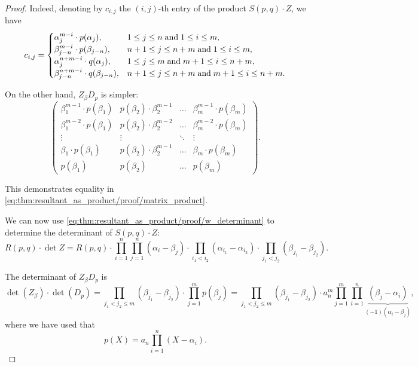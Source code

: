 \begin{proof}
  Indeed, denoting by \( c_{i,j} \) the \( (i, j) \)-th entry of the product \( S(p, q) \cdot Z \), we have
  \begin{equation*}
    c_{i,j} = \begin{cases}
      \alpha_j^{m-i} \cdot p(\alpha_j),         &1 \leq j \leq n \T{and} 1 \leq i \leq m, \\
      \beta_{j-n}^{m-i} \cdot p(\beta_{j-n}),   &n + 1 \leq j \leq n + m \T{and} 1 \leq i \leq m, \\
      \alpha_j^{n+m-i} \cdot q(\alpha_j),       &1 \leq j \leq m \T{and} m + 1 \leq i \leq n + m, \\
      \beta_{j-n}^{n+m-i} \cdot q(\beta_{j-n}), &n + 1 \leq j \leq n + m \T{and} m + 1 \leq i \leq n + m.
    \end{cases}
  \end{equation*}

  On the other hand, \( Z_\beta D_p \) is simpler:
  \begin{equation*}
    \begin{pmatrix}
      \beta_1^{m-1} \cdot p(\beta_1) & p(\beta_2) \cdot \beta_2^{m-1} & \ldots & \beta_m^{m-1} \cdot p(\beta_m) \\
      \beta_1^{m-2} \cdot p(\beta_1) & p(\beta_2) \cdot \beta_2^{m-2} & \ldots & \beta_m^{m-2} \cdot p(\beta_m) \\
      \vdots                         & \vdots                         & \ddots & \vdots                         \\
      \beta_1 \cdot p(\beta_1)       & p(\beta_2) \cdot \beta_2^{m-1} & \ldots & \beta_m \cdot p(\beta_m)       \\
      p(\beta_1)                     & p(\beta_2)                     & \ldots & p(\beta_m)
    \end{pmatrix}.
  \end{equation*}

  This demonstrates equality in \eqref{eq:thm:resultant_as_product/proof/matrix_product}.

  We can now use \eqref{eq:thm:resultant_as_product/proof/w_determinant} to determine the determinant of \( S(p, q) \cdot Z \):
  \begin{equation*}
    R(p, q) \cdot \det Z
    =
    R(p, q) \cdot \prod_{i=1}^n \prod_{j=1}^n (\alpha_i - \beta_j) \cdot \prod_{i_1 < i_2} (\alpha_{i_1} - \alpha_{i_2}) \cdot \prod_{j_1 < j_2} (\beta_{j_1} - \beta_{j_2}).
  \end{equation*}

  The determinant of \( Z_\beta D_p \) is
  \begin{equation*}
    \det(Z_\beta) \cdot \det(D_p)
    =
    \prod_{j_1 < j_2 \leq m} (\beta_{j_1} - \beta_{j_2}) \cdot \prod_{j=1}^m p(\beta_j)
    =
    \prod_{j_1 < j_2 \leq m} (\beta_{j_1} - \beta_{j_2}) \cdot a_n^m \prod_{j=1}^m \prod_{i=1}^n \underbrace{(\beta_j - \alpha_i)}_{(-1)(\alpha_i - \beta_j)},
  \end{equation*}
  where we have used that
  \begin{equation*}
    p(X) = a_n \prod_{i=1}^n (X - \alpha_i).
  \end{equation*}


\end{proof}
